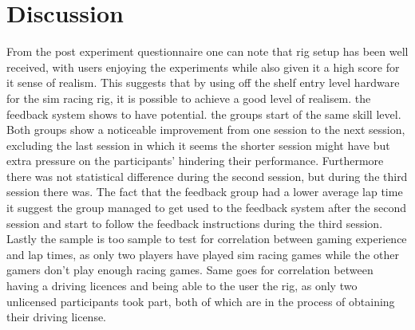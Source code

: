 \section{Discussion}
\label{sec:eval-Discussion}

From the post experiment questionnaire one can note that rig setup has been well received, with users enjoying the experiments while also given it a high score for it sense of realism. This suggests that by using off the shelf entry level hardware for the sim racing rig, it is possible to achieve a good level of realisem. the feedback system shows to have potential. the groups start of the same skill level. Both groups show a noticeable improvement from one session to the next session, excluding the last session in which it seems the shorter session might have but extra pressure on the participants' hindering their performance. Furthermore there was not statistical difference during the second session, but during the third session there was. The fact that the feedback group had a lower average lap time it suggest the group managed to get used to the feedback system after the second session and start to follow the feedback instructions during the third session. Lastly the sample is too sample to test for correlation between gaming experience and lap times, as only two players have played sim racing games while the other gamers don't play enough racing games. Same goes for correlation between having a driving licences and being able to the user the rig, as only two unlicensed participants took part, both of which are in the process of obtaining their driving license.